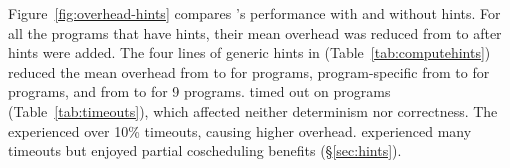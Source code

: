 Figure~\ref{fig:overhead-hints} compares \parrot's performance with and
without hints.  For all the \nprogneedhints programs that 
have hints, their mean overhead was reduced from
\overallnohints to \overallhints after hints were added. The four lines of generic
\compute hints in \libgomp (Table~\ref{tab:computehints}) 
reduced the mean overhead from \genericnolineup
to \genericlineup for \nproggenericlineuphints programs, program-specific
\computes from \specificnolineup to \specificlineup for
\nprogspecificlineuphints programs, and \nondets from \nondetnohints
to \nondethints for 9 programs.  \Computes timed out on
\nlineupfails programs (Table~\ref{tab:timeouts}), which affected neither
determinism nor correctness. The  \kmeans experienced over 10\% timeouts,
causing higher overhead. \xtwosixfour experienced many timeouts
but enjoyed partial coscheduling benefits (\S\ref{sec:hints}).







